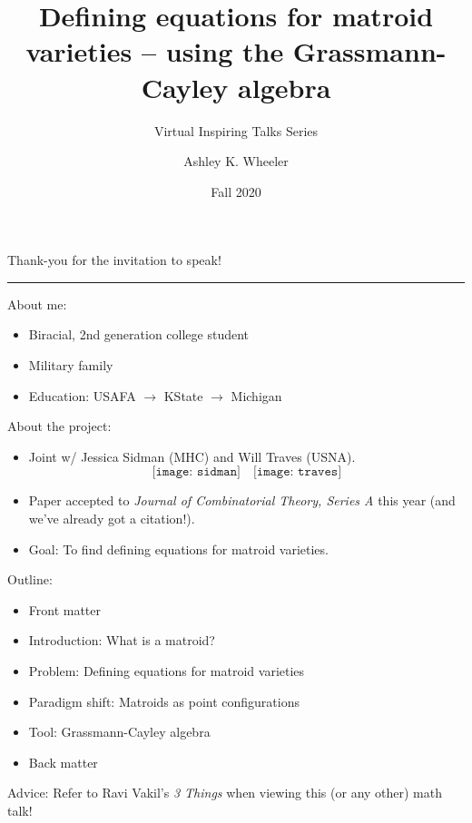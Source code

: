 \documentclass[%
	12pt]{beamer}
\title[Defining equations for matroid varieties]{Defining equations for matroid varieties -- using the Grassmann-Cayley algebra}
\subtitle{Virtual Inspiring Talks Series%
	}%
\author[A. K. Wheeler]{Ashley K. Wheeler%
	}
\institute{\color{powCol}Mount Holyoke College%
	}
\date{%
	Fall 2020}
\theoremstyle{plain}
\theoremstyle{definition}
\begin{document}
	
\begin{frame}
\titlepage
\end{frame}

\begin{frame}
\begin{flushright} \textcolor{powCol}{Thank-you for the invitation to speak!} \end{flushright}

\vspace{0.075pc}
\hrule

\pause
\vspace{1pc}
\textcolor{powCol}{About me:} \pause
\vspace{0.25pc}
\begin{itemize}
\item Biracial, 2nd generation college student \pause
\item Military family \pause
\item Education: USAFA \pause $\to$ KState \pause $\to$ Michigan
\end{itemize}
\end{frame}

\begin{frame}{}{}
\textcolor{powCol}{About the project:} \pause
\vspace{0.25pc} 
\begin{itemize}
\item Joint w/ Jessica Sidman (MHC) and Will Traves (USNA). 
\[
\texttt{[image: sidman]}
\quad
\texttt{[image: traves]}
\]

\pause
\vspace{-0.5pc}
\item Paper accepted to \textit{Journal of Combinatorial Theory, Series A} this year (and we've already got a citation!). \pause
\item \textcolor{powCol}{Goal:} To find defining equations for matroid varieties.
\end{itemize}
\end{frame}
	
\begin{frame}{}{}
\textcolor{powCol}{Outline:}
\vspace{0.25pc}
\begin{itemize}
\item Front matter
\item Introduction: What is a matroid?
\item Problem: Defining equations for matroid varieties
\item Paradigm shift: Matroids as point configurations
\item Tool: Grassmann-Cayley algebra
\item Back matter
\end{itemize}

\pause
\vspace{1pc}
\textcolor{powCol}{Advice:} Refer to Ravi Vakil's \textit{3 Things} when viewing this (or any other) math talk!
\end{frame}
	
\end{document}

